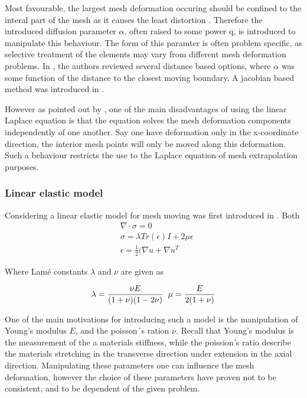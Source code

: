 Most favourable, the largest mesh deformation occuring should be confined to the interal part of the mesh as it causes the least distortion \cite{Jasak2006}. Therefore the introduced diffusion parameter $\alpha$, often raised to some power q, is introduced to manipulate this behaviour. The form of this paramter is often problem specific,  as selective treatment of the elements may vary from different mesh deformation problems. In \cite{Jasak2006}, the authors reviewed several distance based options, where $\alpha$ was some function of the distance to the closest moving boundary. A jacobian based method was introduced in \cite{Stein}.

However as pointed out by \cite{Hsu}, one of the main disadvantages of using the linear Laplace equation is that the equation solves the mesh deformation components independently of one another. Say one have deformation only in the x-coordinate direction, the interior mesh points will only be moved along this deformation. Such a behaviour restricts the use to the Laplace equation of mesh extrapolation purposes. 

\subsubsection*{Linear elastic model}
Considering a linear elastic model for mesh moving was first introduced in \cite{Tezduyar1992}.  
Both \cite{Dwight}
\begin{align*}
&\nabla \cdot \sigma = 0 \\
&\sigma = \lambda Tr(\epsilon) I + 2 \mu \epsilon \\
&\epsilon = \frac{1}{2}(\nabla u + \nabla u^T
\end{align*}

Where Lamé constants $\lambda$ and $\nu$ are given as

\begin{align*}
\lambda = \frac{\nu E}{(1 + \nu)(1 - 2\nu)} \hspace{2mm} \mu = \frac{E}{2(1 + \nu)}
\end{align*}

One of the main motivations for introducing such a model is the manipulation of Young's modulus $E$, and the poisson´s ration $\nu$. Recall that Young's modulus is the measurement of the a materials stiffness, while the poission's ratio describe the materials stretching in the transverse direction under extension in the axial direction. Manipulating these parameters one can influence the mesh deformation,
however the choice of these parameters have proven not to be consistent,  and to be dependent of the given problem.  \\

